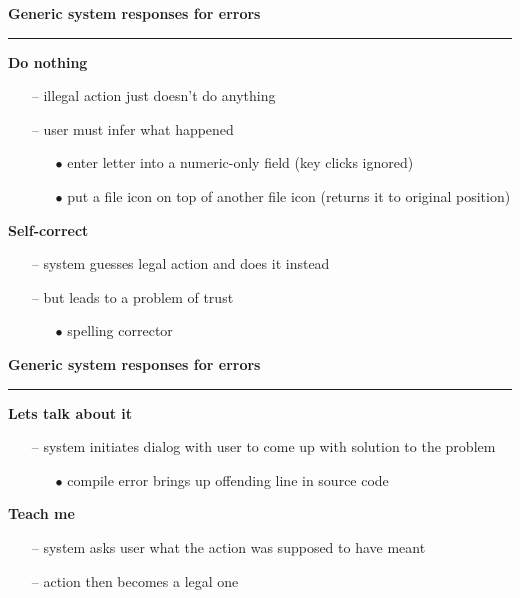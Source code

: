 \documentclass[pdf]{beamer}
\begin{document}
\begin{frame}
{\textbf{Generic system responses for errors}}{\textcolor{red}{\rule{12cm}{1.2pt}}}

\textbf{Do nothing}
\begin{itemize}
\item[--] illegal action just doesn't do anything
\item[--] user must infer what happened

	
		\begin{itemize}
		\item[$\bullet$] enter letter into a numeric-only field (key clicks ignored)

		\item[$\bullet$] put a file icon on top of another file icon (returns it to original position)

		\end{itemize}
	
\end{itemize}

\textbf{Self-correct}
\begin{itemize}
\item[--] system guesses legal action and does it instead
\item[--] but leads to a problem of trust
	\begin{itemize}
		\item[$\bullet$] spelling corrector
		\end{itemize}
	
\end{itemize}

\end{frame}




\begin{frame}
{\textbf{Generic system responses for errors}}{\textcolor{red}{\rule{12cm}{1.2pt}}}

\textbf{Lets talk about it}
\begin{itemize}
\item[--] system initiates dialog with user to come up with solution to the problem
	\begin{itemize}
		\item[$\bullet$] compile error brings up offending line in source code
		\end{itemize}
\end{itemize}

\textbf{Teach me}
\begin{itemize}
\item[--] system asks user what the action was supposed to have meant
\item[--] action then becomes a legal one
\end{itemize}
\end{frame}
\end{document}
